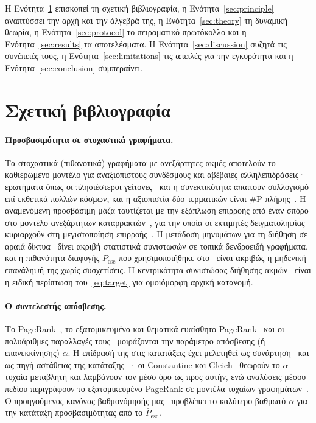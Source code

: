 \documentclass[11pt,a4paper]{article}
\theoremstyle{definition}
\theoremstyle{plain}
\newcommand{\Pesc}{P_{\mathrm{esc}}}
\newcommand{\Pescbar}{\bar{P}_{\mathrm{esc}}}
\begin{document}
Η Ενότητα~\ref{sec:related} επισκοπεί τη σχετική βιβλιογραφία, η Ενότητα~\ref{sec:principle} αναπτύσσει την αρχή και την άλγεβρά της, η Ενότητα~\ref{sec:theory} τη δυναμική θεωρία, η Ενότητα~\ref{sec:protocol} το πειραματικό πρωτόκολλο και η Ενότητα~\ref{sec:results} τα αποτελέσματα. Η Ενότητα~\ref{sec:discussion} συζητά τις συνέπειές τους, η Ενότητα~\ref{sec:limitations} τις απειλές για την εγκυρότητα και η Ενότητα~\ref{sec:conclusion} συμπεραίνει.

\section{Σχετική βιβλιογραφία}\label{sec:related}

\paragraph{Προσβασιμότητα σε στοχαστικά γραφήματα.} Τα στοχαστικά (πιθανοτικά) γραφήματα με ανεξάρτητες ακμές αποτελούν το καθιερωμένο μοντέλο για αναξιόπιστους συνδέσμους και αβέβαιες αλληλεπιδράσεις· ερωτήματα όπως οι πλησιέστεροι γείτονες~\cite{potamias10} και η συνεκτικότητα απαιτούν συλλογισμό επί εκθετικά πολλών κόσμων, και η αξιοπιστία δύο τερματικών είναι \#P-πλήρης~\cite{provanball83}. Η αναμενόμενη προσβάσιμη μάζα ταυτίζεται με την εξάπλωση επιρροής από έναν σπόρο στο μοντέλο ανεξάρτητων καταρρακτών~\cite{kkt03}, για την οποία οι εκτιμητές δειγματοληψίας κυριαρχούν στη μεγιστοποίηση επιρροής~\cite{borgs14,tim14}. Η μετάδοση μηνυμάτων για τη διήθηση σε αραιά δίκτυα~\cite{knz14,newman23} δίνει ακριβή στατιστικά συνιστωσών σε τοπικά δενδροειδή γραφήματα, και η πιθανότητα διαφυγής $\Pesc$ που χρησιμοποιήθηκε στο~\cite{konstantellos26} είναι ακριβώς η μηδενική επανάληψή της χωρίς συσχετίσεις. Η κεντρικότητα συνιστώσας διήθησης ακμών~\cite{hubba08,cytohubba14} είναι η ειδική περίπτωση του~\eqref{eq:target} για ομοιόμορφη αρχική κατανομή.

\paragraph{Ο συντελεστής απόσβεσης.} Το PageRank~\cite{pagerank99}, το εξατομικευμένο και θεματικά ευαίσθητο PageRank~\cite{jeh03,haveliwala03} και οι πολυάριθμες παραλλαγές τους~\cite{gleich15} μοιράζονται την παράμετρο απόσβεσης (ή επανεκκίνησης) $\alpha$. Η επίδρασή της στις κατατάξεις έχει μελετηθεί ως συνάρτηση~\cite{boldi05} και ως πηγή αστάθειας της κατάταξης~\cite{bressan10}· οι Constantine και Gleich~\cite{constantine10} θεωρούν το $\alpha$ τυχαία μεταβλητή και λαμβάνουν τον μέσο όρο ως προς αυτήν, ενώ αναλύσεις μέσου πεδίου περιγράφουν το εξατομικευμένο PageRank σε μοντέλα τυχαίων γραφημάτων~\cite{avrachenkov18}. Ο προηγούμενος κανόνας βαθμονόμησής μας~\cite{konstantellos26} προβλέπει το καλύτερο βαθμωτό $\alpha$ για την κατάταξη προσβασιμότητας από το $\Pescbar$.
\end{document}
